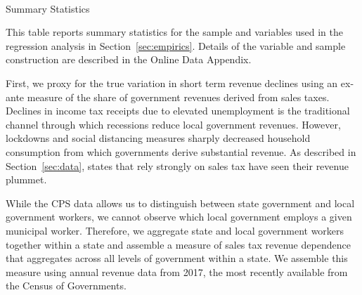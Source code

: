 \begin{singlespace}
\begin{table}
\begin{center}
\begin{threeparttable}
\caption{\\ Summary Statistics}
\label{table:summarystats}
\centering 
\begin{small}
	
\end{small}
\begin{footnotesize}
\begin{tablenotes}
\item This table reports summary statistics for the sample and variables used in the regression analysis in Section~\ref{sec:empirics}. Details of the variable and sample construction are described in the Online Data Appendix.
\end{tablenotes}
\end{footnotesize}
\end{threeparttable}
\end{center}
\end{table}

\end{singlespace}



First, we proxy for the true variation in short term revenue declines using an ex-ante measure of the share of government revenues derived from sales taxes. Declines in income tax receipts due to elevated unemployment is the traditional channel through which recessions reduce local government revenues. However, lockdowns and social distancing measures sharply decreased household consumption from which governments derive substantial revenue. As described in Section~\ref{sec:data}, states that rely strongly on sales tax have seen their revenue plummet.    

While the CPS data allows us to distinguish between state government and local government workers, we cannot observe which local government employs a given municipal worker. Therefore, we aggregate state and local government workers together within a state and assemble a measure of sales tax revenue dependence that aggregates across all levels of government within a state.  We assemble this measure using annual revenue data from 2017, the most recently available from the Census of Governments.

